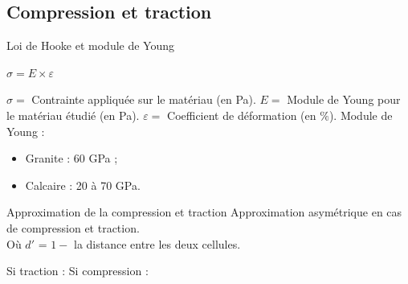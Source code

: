 \documentclass{beamer}
\begin{document}
\subsection{Compression et traction}
\begin{frame}{Loi de Hooke et module de Young}
  \begin{center}
    $\sigma = E \times \varepsilon$
  \end{center}
  $\sigma = $ Contrainte appliquée sur le matériau (en Pa). $E = $ Module de Young pour le matériau étudié (en Pa). $\varepsilon = $ Coefficient de déformation (en $\%$). \smallbreak
  Module de Young :
  \begin{itemize}
    \item Granite : 60 GPa ;
    \item Calcaire : 20 à 70 GPa.
  \end{itemize}
\end{frame}

\begin{frame}{Approximation de la compression et traction}
  Approximation asymétrique en cas de compression et traction. \\
  Où $d'$ = $1 -$ la distance entre les deux cellules. \\
  \begin{center}
    Si traction : \medbreak
     \medbreak
    Si compression : \medbreak
  \end{center}
\end{frame}
\end{document}
